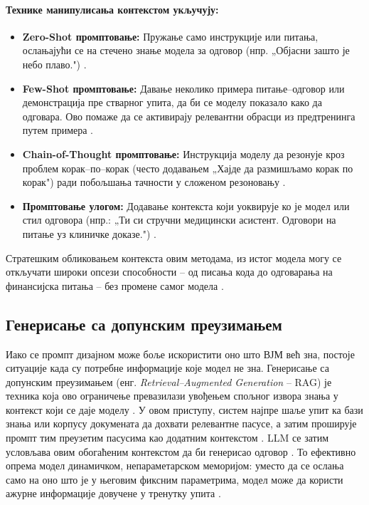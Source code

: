 \paragraph{Технике манипулисања контекстом укључују:}

\begin{itemize}
  \item \textbf{Zero-Shot промптовање:} Пружање само инструкције или питања, ослањајући се на стечено знање модела за одговор (нпр. „Објасни зашто је небо плаво.") \cite{sahoo_systematic_2025}.
  \item \textbf{Few-Shot промптовање:} Давање неколико примера питање--одговор или демонстрација пре стварног упита, да би се моделу показало како да одговара. Ово помаже да се активирају релевантни обрасци из предтренинга путем примера \cite{sahoo_systematic_2025}.
  \item \textbf{Chain-of-Thought промптовање:} Инструкција моделу да резонује кроз проблем корак--по--корак (често додавањем „Хајде да размишљамо корак по корак") ради побољшања тачности у сложеном резоновању \cite{sahoo_systematic_2025}.
  \item \textbf{Промптовање улогом:} Додавање контекста који уоквирује ко је модел или стил одговора (нпр.: „Ти си стручни медицински асистент. Одговори на питање уз клиничке доказе.") \cite{sahoo_systematic_2025}.
\end{itemize}

Стратешким обликовањем контекста овим методама, из истог модела могу се откључати широки опсези способности – од писања кода до одговарања на финансијска питања – без промене самог модела \cite{sahoo_systematic_2025}.

\subsection{Генерисање са допунским преузимањем}

Иако се промпт дизајном може боље искористити оно што ВЈМ већ зна, постоје ситуације када су потребне информације које модел не зна. Генерисање са допунским преузимањем (енг. \textit{Retrieval--Augmented Generation} -- RAG) је техника која ово ограничење превазилази увођењем спољног извора знања у контекст који се даје моделу \cite{lewis_retrieval_2020}. У овом приступу, систем најпре шаље упит ка бази знања или корпусу докумената да дохвати релевантне пасусе, а затим проширује промпт тим преузетим пасусима као додатним контекстом \cite{lewis_retrieval_2020}. LLM се затим условљава овим обогаћеним контекстом да би генерисао одговор \cite{lewis_retrieval_2020}. То ефективно опрема модел динамичком, непараметарском меморијом: уместо да се ослања само на оно што је у његовим фиксним параметрима, модел може да користи ажурне информације довучене у тренутку упита \cite{lewis_retrieval_2020}.

